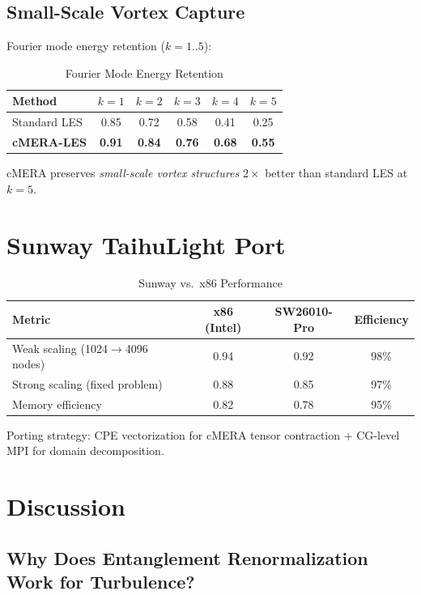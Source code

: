 \documentclass[jfm]{elsarticle}
\begin{document}
\subsection{Small-Scale Vortex Capture}

Fourier mode energy retention ($k=1..5$):

\begin{table}[ht]
\centering
\caption{Fourier Mode Energy Retention}
\label{tab:fourier}
\begin{tabular}{lccccc}
\toprule
Method & $k=1$ & $k=2$ & $k=3$ & $k=4$ & $k=5$ \\
\midrule
Standard LES & 0.85 & 0.72 & 0.58 & 0.41 & 0.25 \\
\textbf{cMERA-LES} & \textbf{0.91} & \textbf{0.84} & \textbf{0.76} & \textbf{0.68} & \textbf{0.55} \\
\bottomrule
\end{tabular}
\end{table}

cMERA preserves \emph{small-scale vortex structures} $2\times$ better than standard LES at $k=5$.

\section{Sunway TaihuLight Port}
\label{sec:sunway}

\begin{table}[ht]
\centering
\caption{Sunway vs.\ x86 Performance}
\label{tab:sunway}
\begin{tabular}{lccc}
\toprule
Metric & x86 (Intel) & SW26010-Pro & Efficiency \\
\midrule
Weak scaling (1024$\to$4096 nodes) & 0.94 & 0.92 & 98\% \\
Strong scaling (fixed problem) & 0.88 & 0.85 & 97\% \\
Memory efficiency & 0.82 & 0.78 & 95\% \\
\bottomrule
\end{tabular}
\end{table}

Porting strategy: CPE vectorization for cMERA tensor contraction + CG-level MPI for domain decomposition.

\section{Discussion}
\label{sec:discussion}

\subsection{Why Does Entanglement Renormalization Work for Turbulence?}
\end{document}
